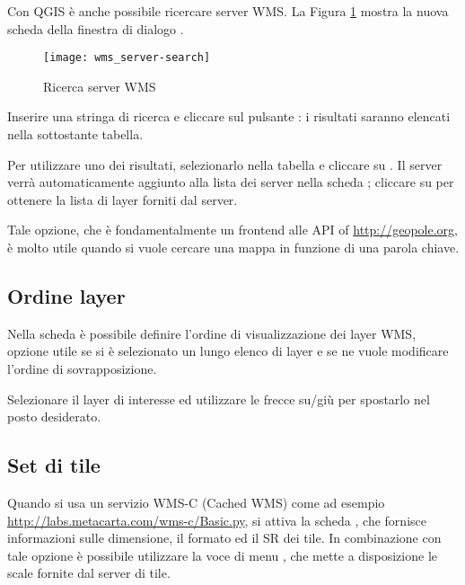 Con QGIS è anche possibile ricercare server WMS. La Figura \ref{fig:searchtab} mostra la nuova scheda 
 della finestra di dialogo .

\begin{figure}[ht]
  \centering
  \texttt{[image: wms\_server-search]}
  	\caption{Ricerca server WMS \nixcaption}\label{fig:searchtab}
\end{figure}

Inserire una stringa di ricerca e cliccare sul pulsante : i risultati saranno elencati nella
sottostante tabella.

Per utilizzare uno dei risultati, selezionarlo nella tabella e cliccare su . 
Il server verrà automaticamente aggiunto alla lista dei server nella scheda ; cliccare su  
per ottenere la lista di layer forniti dal server.

Tale opzione, che è fondamentalmente un frontend alle API of \url{http://geopole.org}, 
è molto utile quando si vuole cercare una mappa in funzione di una parola chiave.

%
%
\subsection{Ordine layer} \label{sec:layerorder}

Nella scheda  è possibile definire l'ordine di visualizzazione dei layer WMS, opzione utile
se si è selezionato un lungo elenco di layer e se ne vuole modificare l'ordine di sovrapposizione.

Selezionare il layer di interesse ed utilizzare le frecce su/giù per spostarlo nel posto desiderato.

%
%
\subsection{Set di tile}\label{sec:tilesets}

Quando si usa un servizio WMS-C (Cached WMS) come ad esempio \url{http://labs.metacarta.com/wms-c/Basic.py}, 
si attiva la scheda , che fornisce informazioni sulle dimensione, il formato ed il SR dei tile.
In combinazione con tale opzione è possibile utilizzare la voce di menu 
 \arrow {}, che mette a disposizione le scale 
fornite dal server di tile.

